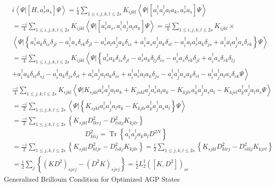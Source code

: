 \documentclass[aps,preprint]{revtex4}%
\begin{document}
\begin{align}
&  i\left\langle \left.  \Psi\right\vert \left[  H,a_{r}^{\dagger}%
a_{s}\right]  \Psi\right\rangle =\frac{i}{4}\sum_{1\leq i,j,k,l\leq2s}%
K_{ijkl}\left\langle \left.  \Psi\right\vert \left[  a_{i}^{\dagger}%
a_{j}^{\dagger}a_{l}a_{k},a_{r}^{\dagger}a_{s}\right]  \Psi\right\rangle \\
&  =\frac{-i}{4}\sum_{1\leq i,j,k,l\leq2s}K_{ijkl}\left\langle \left.
\Psi\right\vert \left[  a_{r}^{\dagger}a_{s},a_{i}^{\dagger}a_{j}^{\dagger
}a_{l}a_{k}\right]  \Psi\right\rangle =\frac{-i}{4}\sum_{1\leq i,j,k,l\leq
2s}K_{ijkl}\times\\
&  \left\langle \left.  \Psi\right\vert \left\{  a_{r}^{\dagger}a_{k}%
\delta_{is}\delta_{jl}-a_{i}^{\dagger}a_{s}\delta_{rk}\delta_{jl}%
-a_{r}^{\dagger}a_{l}a_{j}^{\dagger}a_{k}\delta_{is}+a_{i}^{\dagger}a_{s}%
a_{j}^{\dagger}a_{k}\delta_{rl}-a_{i}^{\dagger}a_{l}a_{r}^{\dagger}a_{k}%
\delta_{js}+a_{i}^{\dagger}a_{l}a_{j}^{\dagger}a_{s}\delta_{rk}\right\}
\Psi\right\rangle \\
&  =\frac{-i}{4}\sum_{1\leq i,j,k,l\leq2s}K_{ijkl}\left\langle {}\right.
\left.  \Psi\right\vert \left\{  a_{r}^{\dagger}a_{k}\delta_{is}\delta
_{jl}-a_{r}^{\dagger}a_{k}\delta_{lj}\delta_{is}-a_{i}^{\dagger}a_{s}%
\delta_{rk}\delta_{jl}+a_{i}^{\dagger}a_{s}\delta_{rk}\delta_{lj}\right. \\
&  +a_{i}^{\dagger}a_{k}\delta_{rl}\delta_{sj}-a_{i}^{\dagger}a_{k}\delta
_{js}\delta_{rl}+\left.  a_{r}^{\dagger}a_{j}^{\dagger}a_{l}a_{k}\delta
_{is}+a_{i}^{\dagger}a_{r}^{\dagger}a_{l}a_{k}\delta_{js}-a_{i}^{\dagger}%
a_{j}^{\dagger}a_{s}a_{k}\delta_{rl}-a_{i}^{\dagger}a_{j}^{\dagger}a_{l}%
a_{s}\delta_{rk}\Psi\right\rangle \\
&  \frac{-i}{4}\sum_{1\leq j,k,l\leq2s}K_{ijkl}\left\langle \Psi|K_{sjkl}%
a_{r}^{\dagger}a_{j}^{\dagger}a_{l}a_{k}+K_{jskl}a_{j}^{\dagger}a_{r}%
^{\dagger}a_{l}a_{k}-K_{kjlr}a_{k}^{\dagger}a_{j}^{\dagger}a_{s}a_{l}%
-K_{kjrl}a_{k}^{\dagger}a_{j}^{\dagger}a_{l}a_{s}\Psi\right\rangle \\
&  =\frac{-i}{2}\sum_{1\leq j,k,l\leq2s}\left\langle \left.  \Psi\right\vert
\left\{  K_{sjkl}a_{r}^{\dagger}a_{j}^{\dagger}a_{l}a_{k}-K_{kjlr}%
a_{k}^{\dagger}a_{j}^{\dagger}a_{s}a_{l}\right\}  \Psi\right\rangle \\
&  =\frac{-i}{2}\sum_{1\leq j,k,l\leq2s}\left\{  K_{sjkl}D_{lkrj}^{2}%
-D_{lskj}^{2}K_{kjlr}\right\}
\end{align}%
\begin{equation}
D_{klij}^{2}=\operatorname{Tr}\left\{  a_{i}^{\dagger}a_{j}^{\dagger}%
a_{k}a_{l}D^{2N}\right\}
\end{equation}%
\begin{align}
&  =\frac{-i}{2}\sum_{1\leq j,k,l\leq2s}\left\{  K_{sjkl}D_{kljr}^{2}%
-D_{lskj}^{2}K_{kjlr}\right\}  =\frac{i}{2}\sum_{1\leq j,k,l\leq2s}\left\{
K_{sjkl}D_{klrj}^{2}-D_{slkj}^{2}K_{kjrl}\right\} \\
&  =\frac{i}{2}\sum_{j}\left\{  \left(  KD^{2}\right)  _{sjrj}-\left(
D^{2}K\right)  _{sjrj}\right\}  =\frac{i}{2}L_{2}^{1}\left(  \left[
K,D^{2}\right]  \right)  _{sr}%
\end{align}
Generalized Brillouin Condition for Optimized AGP States\label{BrillCon}
\end{document}
